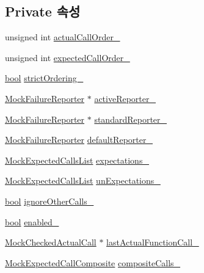 \subsection*{Private 속성}
\begin{DoxyCompactItemize}
\item 
unsigned int \hyperlink{class_mock_support_a58e873078e053e6b06ad68a8a7e0c313}{actual\+Call\+Order\+\_\+}
\item 
unsigned int \hyperlink{class_mock_support_afa5b7a7d70e8552f039255ae1d85f215}{expected\+Call\+Order\+\_\+}
\item 
\hyperlink{avb__gptp_8h_af6a258d8f3ee5206d682d799316314b1}{bool} \hyperlink{class_mock_support_aeabf06d13371d5bbf5663b47374d9ebb}{strict\+Ordering\+\_\+}
\item 
\hyperlink{class_mock_failure_reporter}{Mock\+Failure\+Reporter} $\ast$ \hyperlink{class_mock_support_a75833f9457ebccff4c6e8b55529313fb}{active\+Reporter\+\_\+}
\item 
\hyperlink{class_mock_failure_reporter}{Mock\+Failure\+Reporter} $\ast$ \hyperlink{class_mock_support_a6df54f7f57d625cc6c06c838e37c76c0}{standard\+Reporter\+\_\+}
\item 
\hyperlink{class_mock_failure_reporter}{Mock\+Failure\+Reporter} \hyperlink{class_mock_support_a6af0203dcca7655959d71608423a6bfc}{default\+Reporter\+\_\+}
\item 
\hyperlink{class_mock_expected_calls_list}{Mock\+Expected\+Calls\+List} \hyperlink{class_mock_support_a8f02a0b866ff54bef3fb38cd8bc57fa2}{expectations\+\_\+}
\item 
\hyperlink{class_mock_expected_calls_list}{Mock\+Expected\+Calls\+List} \hyperlink{class_mock_support_a4a55b86a3e9c4570ce32185e5798454e}{un\+Expectations\+\_\+}
\item 
\hyperlink{avb__gptp_8h_af6a258d8f3ee5206d682d799316314b1}{bool} \hyperlink{class_mock_support_a5a3b2bc086fdd2ca5aae69b37ea70942}{ignore\+Other\+Calls\+\_\+}
\item 
\hyperlink{avb__gptp_8h_af6a258d8f3ee5206d682d799316314b1}{bool} \hyperlink{class_mock_support_ab6dfcb3e6c79f4def1295fea7f0de8c0}{enabled\+\_\+}
\item 
\hyperlink{class_mock_checked_actual_call}{Mock\+Checked\+Actual\+Call} $\ast$ \hyperlink{class_mock_support_aadd48976efe51d36597ebe298e6b9233}{last\+Actual\+Function\+Call\+\_\+}
\item 
\hyperlink{class_mock_expected_call_composite}{Mock\+Expected\+Call\+Composite} \hyperlink{class_mock_support_ac97290ed29b85cf2d0f3c3d16f7da7c7}{composite\+Calls\+\_\+}

\end{DoxyCompactItemize}
